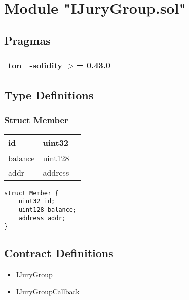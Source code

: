 
\section{Module "IJuryGroup.sol"}


\subsection{Pragmas}


\noindent\begin{tabular}{|l|l|p{5cm}|}\hline
ton & -solidity $>$= 0.43.0 &\\\hline
\end{tabular}


\subsection{Type Definitions}


\subsubsection{Struct Member}


\ifsoltables
\noindent\begin{tabular}{|l|l|p{6cm}|}\hline
id & uint32 & \\\hline
balance & uint128 & \\\hline
addr & address & \\\hline
\end{tabular}
\fi


\begin{lstlisting}[firstnumber=3]
struct Member {
    uint32 id;
    uint128 balance;
    address addr;
}
\end{lstlisting}

\subsection{Contract Definitions}

\begin{itemize}
\item IJuryGroup
\item IJuryGroupCallback
\end{itemize}
